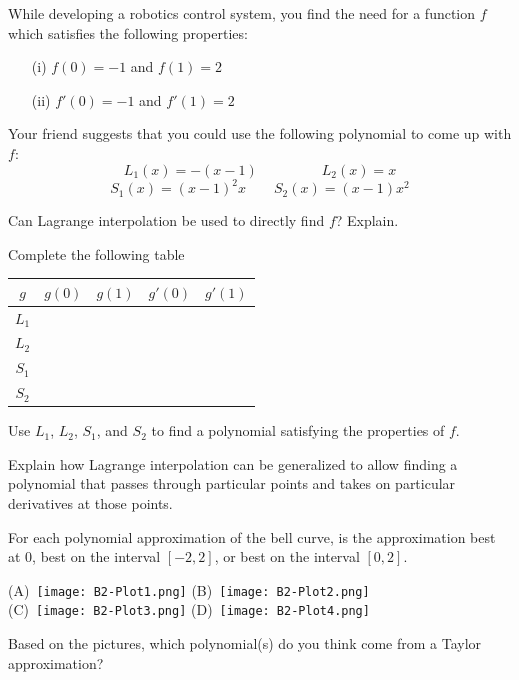 \documentclass{workbook}
\begin{document}
\begin{slide}
	\question
	While developing a robotics control system, you find the need for
	a function $f$ which satisfies the following properties:
	\begin{enumerate}
		\item[(i)] $f(0)=-1$ and $f(1)=2$
		\item[(ii)] $f'(0)=-1$ and $f'(1)=2$
	\end{enumerate}
	Your friend suggests that you could use the following polynomial to come up with $f$:
	\[
		L_1(x)=-(x-1) \qquad\phantom{x}\qquad L_2(x)=x
	\]
	\[
		S_1(x)=(x-1)^2x \qquad S_2(x)=(x-1)x^2
	\]

	\begin{parts}
		\item Can Lagrange interpolation be used to directly find $f$? Explain.
		\item Complete the following table
		\begin{center}
			\begin{tabular}{|c|c|c|c|c|}
				\hline
				$g$   & $g(0)$ & $g(1)$ & $g'(0)$ & $g'(1)$ \\
				\hline
				$L_1$ &        &        &         &         \\
				\hline
				$L_2$ &        &        &         &         \\
				\hline
				$S_1$ &        &        &         &         \\
				\hline
				$S_2$ &        &        &         &         \\
				\hline
			\end{tabular}
		\end{center}
		\item Use $L_1$, $L_2$, $S_1$, and $S_2$ to find a polynomial satisfying the properties of $f$.
		\item Explain how Lagrange interpolation can be generalized to allow finding a polynomial
		that passes through particular points and takes on particular derivatives at those points.
	\end{parts}
\end{slide}

\begin{slide}
	\question
	\begin{parts}
		\item For each polynomial approximation of the bell curve, is the approximation best at
		$0$, best on the interval $[-2,2]$, or best on the interval $[0,2]$.

		(A)~\texttt{[image: B2-Plot1.png]}
		(B)~\texttt{[image: B2-Plot2.png]}\\
		(C)~\texttt{[image: B2-Plot3.png]}
		(D)~\texttt{[image: B2-Plot4.png]}
		\item Based on the pictures, which polynomial(s) do you think come from a Taylor approximation?
	\end{parts}
\end{slide}
\end{document}
